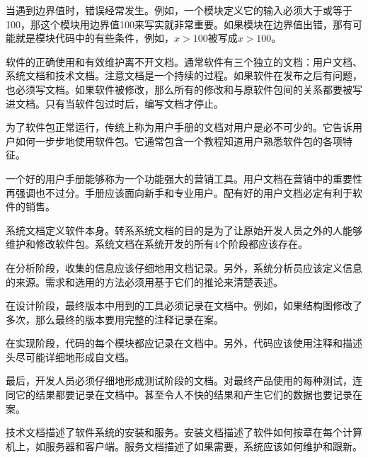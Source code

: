 当遇到边界值时，错误经常发生。例如，一个模块定义它的输入必须大于或等于100，那这个模块用边界值100来写实就非常重要。如果模块在边界值出错，那有可能就是模块代码中的有些条件，例如，$x>100$被写成$x>100$。

软件的正确使用和有效维护离不开文档。通常软件有三个独立的文档：用户文档、系统文档和技术文档。注意文档是一个持续的过程。如果软件在发布之后有问题，也必须写文档。如果软件被修改，那么所有的修改和与原软件包间的关系都要被写进文档。只有当软件包过时后，编写文档才停止。

为了软件包正常运行，传统上称为用户手册的文档对用户是必不可少的。它告诉用户如何一步步地使用软件包。它通常包含一个教程知道用户熟悉软件包的各项特征。

一个好的用户手册能够称为一个功能强大的营销工具。用户文档在营销中的重要性再强调也不过分。手册应该面向新手和专业用户。配有好的用户文档必定有利于软件的销售。

系统文档定义软件本身。转系系统文档的目的是为了让原始开发人员之外的人能够维护和修改软件包。系统文档在系统开发的所有4个阶段都应该存在。

在分析阶段，收集的信息应该仔细地用文档记录。另外，系统分析员应该定义信息的来源。需求和选用的方法必须用基于它们的推论来清楚表述。

在设计阶段，最终版本中用到的工具必须记录在文档中。例如，如果结构图修改了多次，那么最终的版本要用完整的注释记录在案。

在实现阶段，代码的每个模块都应记录在文档中。另外，代码应该使用注释和描述头尽可能详细地形成自文档。

最后，开发人员必须仔细地形成测试阶段的文档。对最终产品使用的每种测试，连同它的结果都要记录在文档中。甚至令人不快的结果和产生它们的数据也要记录在案。

技术文档描述了软件系统的安装和服务。安装文档描述了软件如何按章在每个计算机上，如服务器和客户端。服务文档描述了如果需要，系统应该如何维护和跟新。
